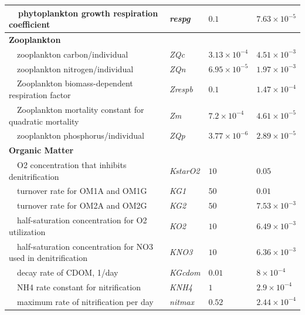 \documentclass[letterpaper,12pt,oneside]{article}\usepackage[]{graphicx}\usepackage[]{color}
\begin{document}
\begin{table}[!tbp]
{\begin{center}
\begin{tabular}{llll}
~~phytoplankton growth respiration coefficient&\textit{respg}&$0.1$&$7.63\times 10^{-5}$\tabularnewline
\hline
{\bfseries Zooplankton}&&&\tabularnewline
~~zooplankton carbon/individual&\textit{ZQc}&$3.13\times 10^{-4}$&$4.51\times 10^{-3}$\tabularnewline
~~zooplankton nitrogen/individual&\textit{ZQn}&$6.95\times 10^{-5}$&$1.97\times 10^{-3}$\tabularnewline
~~Zooplankton biomass-dependent respiration factor&\textit{Zrespb}&$0.1$&$1.47\times 10^{-4}$\tabularnewline
~~Zooplankton mortality constant for quadratic mortality&\textit{Zm}&$7.2\times 10^{-4}$&$4.61\times 10^{-5}$\tabularnewline
~~zooplankton phosphorus/individual&\textit{ZQp}&$3.77\times 10^{-6}$&$2.89\times 10^{-5}$\tabularnewline
\hline
{\bfseries Organic Matter}&&&\tabularnewline
~~O2 concentration that inhibits denitrification&\textit{KstarO2}&$10$&$0.05$\tabularnewline
~~turnover rate for OM1A and OM1G&\textit{KG1}&$50$&$0.01$\tabularnewline
~~turnover rate for OM2A and OM2G&\textit{KG2}&$50$&$7.53\times 10^{-3}$\tabularnewline
~~half-saturation concentration for O2 utilization&\textit{KO2}&$10$&$6.49\times 10^{-3}$\tabularnewline
~~half-saturation concentration for NO3 used in denitrification&\textit{KNO3}&$10$&$6.36\times 10^{-3}$\tabularnewline
~~decay rate of CDOM, 1/day&\textit{KGcdom}&$0.01$&$8\times 10^{-4}$\tabularnewline
~~NH4 rate constant for nitrification&\textit{KNH4}&$1$&$2.9\times 10^{-4}$\tabularnewline
~~maximum rate of nitrification per day&\textit{nitmax}&$0.52$&$2.44\times 10^{-4}$\tabularnewline
\hline
\end{tabular}\end{center}}

\end{table}





\clearpage

\end{document}
